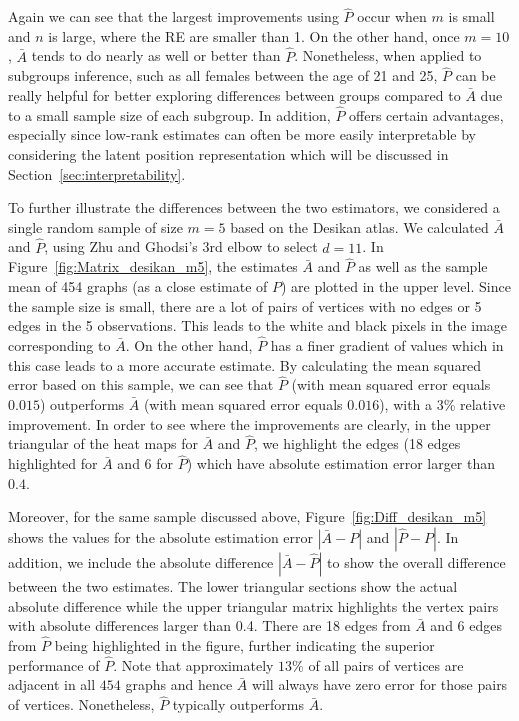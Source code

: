 Again we can see that the largest improvements using $\hat{P}$ occur when $m$ is small and $n$ is large, where the RE are smaller than 1.
On the other hand, once $m=10$, $\bar{A}$ tends to do nearly as well or better than $\hat{P}$. 
Nonetheless, when applied to subgroups inference, such as all females between the age of 21 and 25, $\hat{P}$ can be really helpful for better exploring differences between groups compared to $\bar{A}$ due to a small sample size of each subgroup.
In addition, $\hat{P}$ offers certain advantages, especially since low-rank estimates can often be more easily interpretable by considering the latent position representation which will be discussed in Section~\ref{sec:interpretability}.

To further illustrate the differences between the two estimators, we considered a single random sample of size $m=5$ based on the Desikan atlas.
We calculated $\bar{A}$ and $\hat{P}$, using  Zhu and Ghodsi's 3rd elbow to select $d=11$. 
In Figure~\ref{fig:Matrix_desikan_m5}, the estimates $\bar{A}$ and $\hat{P}$ as well as the sample mean of 454 graphs (as a close estimate of $P$) are plotted in the upper level. 
Since the sample size is small, there are a lot of pairs of vertices with no edges or 5 edges in the 5 observations.
This leads to the white and black pixels in the image corresponding to $\bar{A}$.
On the other hand, $\hat{P}$ has a finer gradient of values which in this case leads to a more accurate estimate.
By calculating the mean squared error based on this sample, we can see that $\hat{P}$ (with mean squared error equals $0.015$) outperforms $\bar{A}$ (with mean squared error equals $0.016$), with a 3\% relative improvement.
In order to see where the improvements are clearly, in the upper triangular of the heat maps for $\bar{A}$ and $\hat{P}$, we highlight the edges (18 edges highlighted for $\bar{A}$ and 6 for $\hat{P}$) which have absolute estimation error larger than $0.4$.


Moreover, for the same sample discussed above, Figure~\ref{fig:Diff_desikan_m5} shows the values for the absolute estimation error $|\bar{A} - P|$ and $|\hat{P}-P|$. In addition, we include the absolute difference $|\bar{A} - \hat{P}|$ to show the overall difference between the two estimates. The lower triangular sections show the actual absolute difference while the upper triangular matrix highlights the vertex pairs with absolute differences larger than 0.4. 
There are 18 edges from $\bar{A}$ and 6 edges from $\hat{P}$ being highlighted in the figure, further indicating the superior performance of $\hat{P}$.
Note that approximately $13\%$ of all pairs of vertices are adjacent in all $454$ graphs and hence $\bar{A}$ will always have zero error for those pairs of vertices.
Nonetheless, $\hat{P}$ typically outperforms $\bar{A}$.

